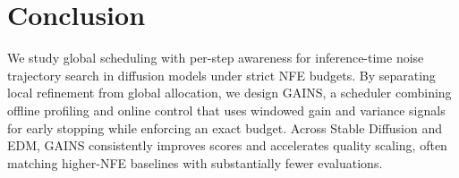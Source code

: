 \section{Conclusion}
\label{sec:conclusion}

We study global scheduling with per-step awareness for inference-time noise trajectory search in diffusion models under strict NFE budgets.
By separating local refinement from global allocation, we design GAINS, a scheduler combining offline profiling and online control that uses windowed gain and variance signals for early stopping while enforcing an exact budget.
Across Stable Diffusion and EDM, GAINS consistently improves scores and accelerates quality scaling, often matching higher-NFE baselines with substantially fewer evaluations.
